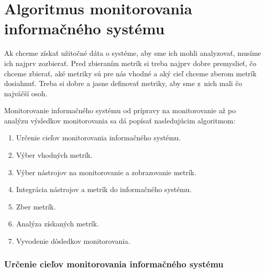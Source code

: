 \documentclass[a4paper, upjsfrontpage, disablespecwarning, thesismargins, thesislinespacing]{rnthesis}
\begin{document}


\chapter{Algoritmus monitorovania informačného systému}

Ak chceme získať užitočné dáta o systéme, aby sme ich mohli analyzovať, musíme ich najprv zozbierať.
Pred zbieraním metrík si treba najprv dobre premyslieť, čo chceme zbierať, 
aké metriky sú pre nás vhodné a aký cieľ chceme zberom metrík dosiahnuť.
Treba si dobre a jasne definovať metriky, aby sme z~nich mali čo najväčší osoh.


Monitorovanie informačného systému od prípravy na monitorovanie až po analýzu výsledkov monitorovania sa dá popísať nasledujúcim algoritmom:

\begin{enumerate}
	\item Určenie cieľov monitorovania informačného systému.
	\item Výber vhodných metrík.
	\item Výber nástrojov na monitorovanie a zobrazovanie metrík.
	\item Integrácia nástrojov a metrík do informačného systému.
	\item Zber metrík.
	\item Analýza získaných metrík.
	\item Vyvodenie dôsledkov monitorovania.
\end{enumerate}

\subsection*{Určenie cieľov monitorovania informačného systému}
\end{document}
